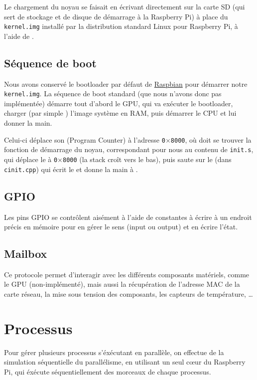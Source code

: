 \documentclass[11pt,a4paper]{article}
\newcommand{\hex}[1]{\texttt{0$\times$#1}}
\newcommand{\fname}[1]{\texttt{#1}} %
\begin{document}
Le chargement du noyau se faisait en écrivant directement sur la carte SD
(qui sert de stockage et de disque de démarrage à la Raspberry Pi) à place
du \fname{kernel.img} installé par la distribution standard Linux pour
Raspberry Pi, à l'aide de .

\subsection{Séquence de boot}
Nous avons conservé le bootloader par défaut de
\href{https://www.raspberrypi.org/downloads/raspbian/}{Raspbian} pour démarrer
notre \fname{kernel.img}. La séquence de boot standard (que nous n'avons donc
pas implémentée) démarre tout d'abord le GPU, qui va exécuter le bootloader,
charger (par simple ) l'image système en RAM, puis démarrer le
CPU et lui donner la main.

Celui-ci déplace son  (Program Counter) à l'adresse \hex{8000},
où doit se trouver la fonction de démarrage du noyau, correspondant pour nous
au contenu de \fname{init.s}, qui déplace le  à \hex{8000} (la stack
croît vers le bas), puis saute sur le  (dans \fname{cinit.cpp})
qui écrit le  et donne la main à .

\subsection{GPIO}
Les pins GPIO se contrôlent aisément à l'aide de constantes à écrire à un
endroit précis en mémoire pour en gérer le sens (input ou output) et en écrire
l'état.

\subsection{Mailbox}
Ce protocole permet d'interagir avec les différents composants matériels,
comme le GPU (non-implémenté), mais aussi la récupération de l'adresse MAC
de la carte réseau, la mise sous tension des composants, les capteurs de
température, \ldots

\section{Processus}

Pour gérer plusieurs processus s'éxécutant en parallèle, on effectue
de la simulation séquentielle du parallélisme, en utilisant un seul
cœur du Raspberry Pi, qui éxécute séquentiellement des morceaux de
chaque processus.
\end{document}
